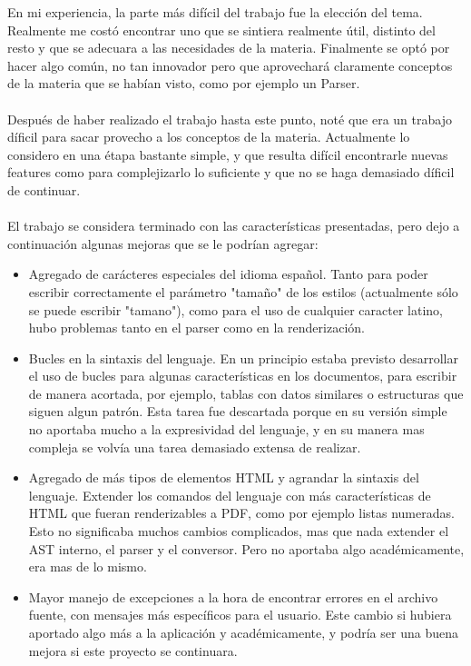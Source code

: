 \documentclass{article}
\begin{document}
En mi experiencia, la parte más difícil del trabajo fue la elección del tema. Realmente me costó encontrar uno que se sintiera realmente útil, distinto del resto y que se adecuara a las necesidades de la materia. Finalmente se optó por hacer algo común, no tan innovador pero que aprovechará claramente conceptos de la materia que se habían visto, como por ejemplo un Parser.
\\~\\
Después de haber realizado el trabajo hasta este punto, noté que era un trabajo díficil para sacar provecho a los conceptos de la materia. Actualmente lo considero en una étapa bastante simple, y que resulta difícil encontrarle nuevas features como para complejizarlo lo suficiente y que no se haga demasiado díficil de continuar.
\\~\\
El trabajo se considera terminado con las características presentadas, pero dejo a continuación algunas mejoras que se le podrían agregar:
\begin{itemize}
    \item Agregado de carácteres especiales del idioma español. Tanto para poder escribir correctamente el parámetro "tamaño" de los estilos (actualmente sólo se puede escribir "tamano"), como para el uso de cualquier caracter latino, hubo problemas tanto en el parser como en la renderización.
    \item Bucles en la sintaxis del lenguaje. En un principio estaba previsto desarrollar el uso de bucles para algunas características en los documentos, para escribir de manera acortada, por ejemplo, tablas con datos similares o estructuras que siguen algun patrón. Esta tarea fue descartada porque en su versión simple no aportaba mucho a la expresividad del lenguaje, y en su manera mas compleja se volvía una tarea demasiado extensa de realizar.
    \item Agregado de más tipos de elementos HTML y agrandar la sintaxis del lenguaje. Extender los comandos del lenguaje con más características de HTML que fueran renderizables a PDF, como por ejemplo listas numeradas. Esto no significaba muchos cambios complicados, mas que nada extender el AST interno, el parser y el conversor. Pero no aportaba algo académicamente, era mas de lo mismo.
    \item Mayor manejo de excepciones a la hora de encontrar errores en el archivo fuente, con mensajes más específicos para el usuario. Este cambio si hubiera aportado algo más a la aplicación y académicamente, y podría ser una buena mejora si este proyecto se continuara.
\end{itemize}
\end{document}
